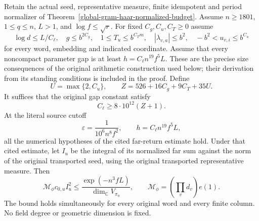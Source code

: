 \begin{theorem}
\label{global-gram-far-absorption}
Retain the actual seed, representative measure, finite idempotent and
period normalizer of Theorem~\ref{global-gram-haar-normalized-budget}.
Assume $n\geq1801$, $1\leq q\leq n$, $L>1$, and
$\log f\leq\sqrt r$.  For fixed $C_g,C_u,C_T\geq0$ assume
\[
 \log d\leq L/C_\ell,\quad g\leq b^{2C_g},\quad
 1\leq T_u\leq b^{C_Tm},\quad
 |\lambda_{v,a}|\leq b^2,\quad
 -b^2<u_{v,i}\leq b^{C_u}
\]
for every word, embedding and indicated coordinate.  Assume that
every noncompact parameter gap is at least
$h=C_\ell n^{19}f^5L$.  These are the precise size consequences
of the original arithmetic construction used below; their derivation
from its standing conditions is included in the proof.  Define
\[
 U=\max\{2,C_u\},\qquad
 Z=526+16C_g+9C_T+35U.
\]
It suffices that the original gap constant satisfy
\begin{equation}\label{global-gram-far-Cl}
 C_\ell\geq8\cdot10^{12}(Z+1).
\end{equation}
At the literal source cutoff
\begin{equation}\label{global-gram-far-literal-cutoff}
 \varepsilon=\frac1{10^6n^8f^2},\qquad
 h=C_\ell n^{19}f^5L,
\end{equation}
all the numerical hypotheses of the cited far-return estimate
hold.  Under that cited estimate, let $I_u$ be the integral of its
normalized far sum against the norm of the original transported seed,
using the original transported representative measure.  Then
\begin{equation}\label{global-gram-far-absorbed}
 \mathcal M_\phi c_{0,u}I_u^2
 \leq \frac{\exp(-n^3fL)}{\dim_{\mathbb C}V_{\pi_u}},
 \qquad \mathcal M_\phi=(\prod_vd_v)e(1).
\end{equation}
The bound holds simultaneously for every original word and every
finite column.  No field degree or geometric dimension is fixed.
\end{theorem}

